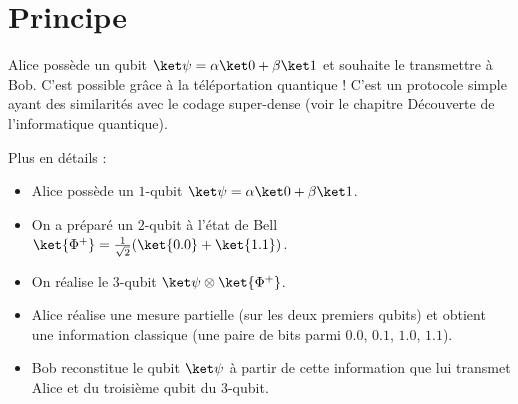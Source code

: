 \documentclass[11pt,class=report,crop=false]{standalone}
\begin{document}



\section{Principe}


Alice possède un qubit $\ket\psi = \alpha \ket0 + \beta\ket1$ et souhaite le transmettre à Bob. C'est possible grâce à la téléportation quantique !
C'est un protocole simple ayant des similarités avec le codage super-dense (voir le chapitre \og{}Découverte de l'informatique quantique\fg{}).

Plus en détails :
\begin{itemize}
  \item Alice possède un $1$-qubit $\ket\psi = \alpha \ket0 + \beta\ket1$.

  \item On a préparé un $2$-qubit à l'état de Bell 
$\ket{\Phi^+} = \frac1{\sqrt2}(\ket{0.0}+\ket{1.1})$.
  
  \item On réalise le $3$-qubit $\ket \psi \otimes \ket {\Phi^+}$.

  \item Alice réalise une mesure partielle (sur les deux premiers qubits) et obtient une information classique (une paire de bits parmi $0.0$, $0.1$, $1.0$, $1.1$).

  \item Bob reconstitue le qubit $\ket\psi$ à partir de cette information que lui transmet Alice et du troisième qubit du $3$-qubit. 

\end{itemize}


\end{document}
